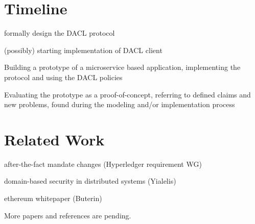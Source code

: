 \documentclass[12pt, conference]{IEEEtran}
\begin{document}
%
%

\newpage

\section{Timeline}

\begin{list}{-}{ }
\item formally design the DACL protocol
\item (possibly) starting implementation of DACL client
\item Building a prototype of a microservice based application, implementing the protocol and using the DACL policies
\item Evaluating the prototype as a proof-of-concept, referring to defined claims and new problems, found during the modeling and/or implementation process
\end{list}


\section*{Related Work}



\begin{list}{-}{}
\item after-the-fact mandate changes (Hyperledger requirement WG)
\item domain-based security in distributed systems (Yialelis)
\item ethereum whitepaper (Buterin)
\item 
\end{list}

More papers and references are pending. 



\end{document}
